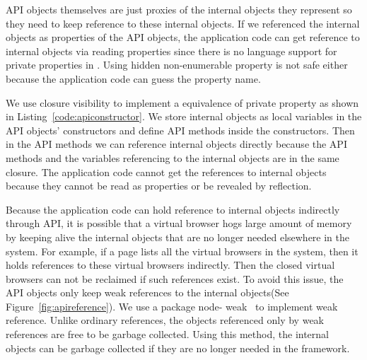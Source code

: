 API objects themselves are just proxies of the internal objects they
represent so they need to keep reference to these internal objects. If we
referenced the internal objects as properties of the API objects, the
application code can get reference to internal objects via reading
properties  since there is no language support for private properties in \js.
Using hidden non-enumerable property is not safe either because the
application code can guess the property name.

We use closure visibility to implement a equivalence of private property as
shown in Listing~\ref{code:apiconstructor}. We store internal objects as local
variables in the API objects' constructors and define API methods inside the
constructors. Then in the API methods we can reference internal objects
directly because the API methods and the variables referencing to the internal
objects are in the same closure. The application code cannot get the
references to internal objects because they cannot be read as properties or be
revealed by reflection.




Because the application code can hold reference to internal objects indirectly
through API, it is possible that a virtual browser hogs large amount of memory
by keeping alive the internal objects that are no longer needed elsewhere in
the system.  For example, if a page lists all the virtual browsers in the
system, then it holds references to these virtual browsers indirectly. Then
the closed virtual browsers can not be reclaimed if such references exist.
To avoid this issue, the API objects only keep weak references to the internal
objects(See Figure~\ref{fig:apireference}). We use a \nodejs{} package node-
weak~\cite{nodeweak} to implement weak reference. Unlike ordinary references,
the objects referenced only by weak references are free to be garbage
collected. Using this method, the internal objects can be garbage collected
if they are no longer needed in the framework.


